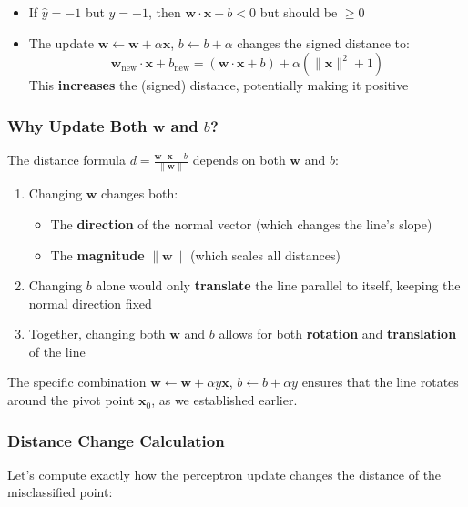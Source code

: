 \begin{notechapter}
\begin{itemize}
    \item If $\hat{y} = -1$ but $y = +1$, then $\mathbf{w} \cdot \mathbf{x} + b < 0$ but should be $\geq 0$
    \item The update $\mathbf{w} \leftarrow \mathbf{w} + \alpha \mathbf{x}$, $b \leftarrow b + \alpha$ changes the signed distance to:
    \[
    \mathbf{w}_{\text{new}} \cdot \mathbf{x} + b_{\text{new}} = (\mathbf{w} \cdot \mathbf{x} + b) + \alpha(\|\mathbf{x}\|^2 + 1)
    \]
    This \textbf{increases} the (signed) distance, potentially making it positive
\end{itemize}

\subsubsection{Why Update Both $\mathbf{w}$ and $b$?}

The distance formula $d = \frac{\mathbf{w} \cdot \mathbf{x} + b}{\|\mathbf{w}\|}$ depends on both $\mathbf{w}$ and $b$:

\begin{enumerate}
    \item Changing $\mathbf{w}$ changes both:
    \begin{itemize}
        \item The \textbf{direction} of the normal vector (which changes the line's slope)
        \item The \textbf{magnitude} $\|\mathbf{w}\|$ (which scales all distances)
    \end{itemize}
    
    \item Changing $b$ alone would only \textbf{translate} the line parallel to itself, keeping the normal direction fixed
    
    \item Together, changing both $\mathbf{w}$ and $b$ allows for both \textbf{rotation} and \textbf{translation} of the line
\end{enumerate}

The specific combination $\mathbf{w} \leftarrow \mathbf{w} + \alpha y \mathbf{x}$, $b \leftarrow b + \alpha y$ ensures that the line rotates around the pivot point $\mathbf{x}_0$, as we established earlier.

\subsubsection{Distance Change Calculation}

Let's compute exactly how the perceptron update changes the distance of the misclassified point:


\end{notechapter}
